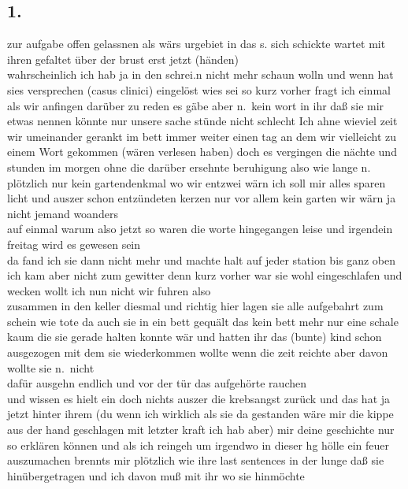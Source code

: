 \documentclass[
]{article}
\author{}
\date{\vspace{-2.5em}}
\begin{document}
\subsection{1.}\label{section}

zur aufgabe offen gelassnen als wärs urgebiet in das s. sich schickte
wartet mit ihren gefaltet über der brust erst jetzt (händen)\\
wahrscheinlich ich hab ja in den schrei.n nicht mehr schaun wolln und
wenn hat sies versprechen (casus clinici) eingelöst wies sei so kurz
vorher fragt ich einmal als wir anfingen darüber zu reden es gäbe aber
n.~kein wort in ihr daß sie mir etwas nennen könnte nur unsere sache
stünde nicht schlecht Ich ahne wieviel zeit wir umeinander gerankt im
bett immer weiter einen tag an dem wir vielleicht zu einem Wort gekommen
(wären verlesen haben) doch es vergingen die nächte und stunden im
morgen ohne die darüber ersehnte beruhigung also wie lange n.\\
plötzlich nur kein gartendenkmal wo wir entzwei wärn ich soll mir alles
sparen licht und auszer schon entzündeten kerzen nur vor allem kein
garten wir wärn ja nicht jemand woanders\\
auf einmal warum also jetzt so waren die worte hingegangen leise und
irgendein freitag wird es gewesen sein\\
da fand ich sie dann nicht mehr und machte halt auf jeder station bis
ganz oben\\
ich kam aber nicht zum gewitter denn kurz vorher war sie wohl
eingeschlafen und wecken wollt ich nun nicht wir fuhren also\\
zusammen in den keller diesmal und richtig hier lagen sie alle
aufgebahrt zum schein wie tote da auch sie in ein bett gequält das kein
bett mehr nur eine schale kaum die sie gerade halten konnte wär und
hatten ihr das (bunte) kind schon ausgezogen mit dem sie wiederkommen
wollte wenn die zeit reichte aber davon wollte sie n.~nicht\\
dafür ausgehn endlich und vor der tür das aufgehörte rauchen\\
und wissen es hielt ein doch nichts auszer die krebsangst zurück und das
hat ja jetzt hinter ihrem (du wenn ich wirklich als sie da gestanden
wäre mir die kippe aus der hand geschlagen mit letzter kraft ich hab
aber) mir deine geschichte nur so erklären können und als ich reingeh um
irgendwo in dieser hg hölle ein feuer\\
auszumachen brennts mir plötzlich wie ihre last sentences in der lunge
daß sie hinübergetragen und ich davon muß mit ihr wo sie hinmöchte\\
\end{document}
